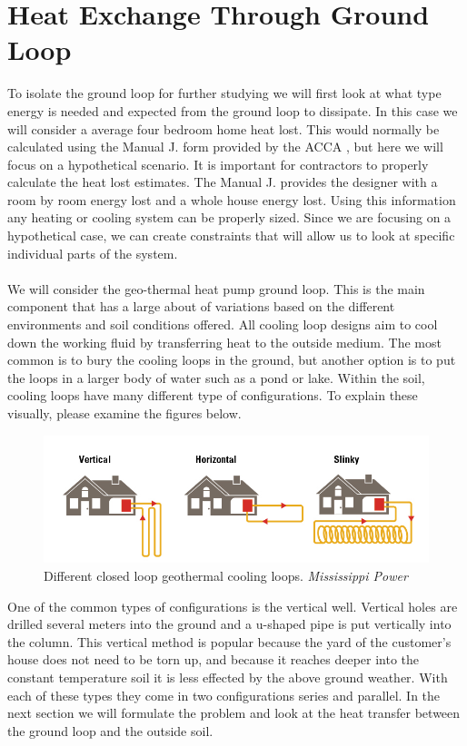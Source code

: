 \section{Heat Exchange Through Ground Loop}
To isolate the ground loop for further studying we will first look at what type energy is needed and expected from the ground loop to dissipate. In this case we will consider a average four bedroom home heat lost. This would normally be calculated using the Manual J. form provided by the ACCA \cite{ACCAManualJ}, but here we will focus on a hypothetical scenario. It is important for contractors to properly calculate the heat lost estimates. The Manual J. provides the designer with a room by room energy lost and a whole house energy lost. Using this information any heating or cooling system can be properly sized. Since we are focusing on a hypothetical case, we can create constraints that will allow us to look at specific individual parts of the system. \\ \\
%
We will consider the geo-thermal heat pump ground loop. This is the main component that has a large about of variations based on the different environments and soil conditions offered. All cooling loop designs aim to cool down the working fluid by transferring heat to the outside medium. The most common is to bury the cooling loops in the ground, but another option is to put the loops in a larger body of water such as a pond or lake. Within the soil, cooling loops have many different type of configurations. To explain these visually, please examine the figures below.
%
\begin{figure}[H]
    \centering
    \includegraphics[width=6in]{pictures/GroundLoops.png}
    \caption{Different closed loop geothermal cooling loops. \textit{Mississippi Power \cite{GCHP}}}
\end{figure}
%
\noindent
One of the common types of configurations is the vertical well. Vertical holes are drilled several meters into the ground and a u-shaped pipe is put vertically into the column. This vertical method is popular because the yard of the customer's house does not need to be torn up, and because it reaches deeper into the constant temperature soil it is less effected by the above ground weather. With each of these types they come in two configurations series and parallel. In the next section we will formulate the problem and look at the heat transfer between the ground loop and the outside soil.